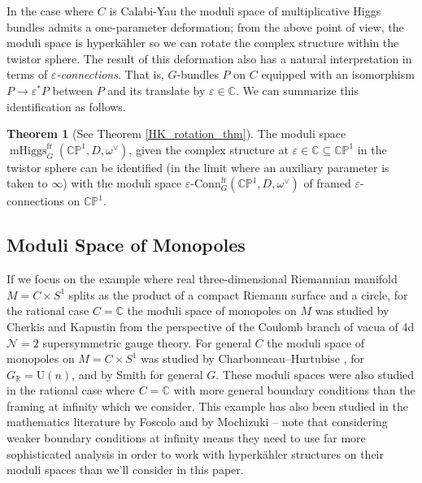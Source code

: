 \documentclass[11pt, oneside, reqno]{amsart}
\theoremstyle{definition} \newtheorem{definition}{Definition}[section]
\newtheorem{theorem}[definition]{Theorem}
\theoremstyle{definition} \newtheorem{remark}[definition]{Remark}
\theoremstyle{definition} \newtheorem{remarks}[definition]{Remarks}
\theoremstyle{definition} \newtheorem{question}[definition]{Question}
\theoremstyle{definition} \newtheorem*{note}{Note}
\theoremstyle{definition} \newtheorem{example}[definition]{Example}
\theoremstyle{definition} \newtheorem{examples}[definition]{Examples}
\renewcommand{\gg}{\mathfrak{g}}
\newcommand{\bb}[1]{\mathbb{#1}}
\newcommand{\mr}[1]{\mathrm{#1}}
\newcommand{\CC}{\mathbb{C}}
\newcommand{\RR}{\mathbb{R}}
\newcommand{\eps}{\varepsilon}
\newcommand{\sub}{\subseteq}
\DeclareMathOperator{\mhiggs}{mHiggs}
\newcommand{\epsconn}{\varepsilon\text{-Conn}}
\renewcommand{\d}{\mathrm{d}}
\begin{document}
 In the case where $C$ is Calabi-Yau the moduli space of multiplicative Higgs bundles admits a one-parameter deformation; from the above point of view, the moduli space is hyperk\"ahler so we can rotate the complex structure within the twistor sphere.  The result of this deformation also has a natural interpretation in terms of \emph{$\eps$-connections}.  That is, $G$-bundles $P$ on $C$ equipped with an isomorphism $P \to \eps^*P$ between $P$ and its translate by $\eps \in \CC$.  We can summarize this identification as follows.
 
 \begin{theorem} [See Theorem \ref{HK_rotation_thm}]
 The moduli space $\mhiggs^{\text{fr}}_G(\bb{CP}^1,D,\omega^\vee)$, given the complex structure at $\eps \in \CC \sub \bb{CP}^1$ in the twistor sphere can be identified (in the limit where an auxiliary parameter is taken to $\infty$) with the moduli space $\epsconn^{\text{fr}}_G(\bb{CP}^1,D,\omega^\vee)$ of framed $\eps$-connections on $\bb{CP}^1$.
 \end{theorem}

\subsection{Moduli Space of Monopoles}

If we focus on the example where real three-dimensional Riemannian
manifold $M = C \times S^1$ splits as the product of a compact Riemann
surface and a circle, for the rational case $C = \CC$ the moduli space
of monopoles on $M$ was studied by Cherkis and Kapustin
\cite{CherkisKapustin1,CherkisKapustin2,CherkisKapustin3} from the
perspective of the Coulomb branch of vacua of 4d $\mathcal{N}=2$
supersymmetric gauge theory. For general $C$ the moduli space of
monopoles on $M = C \times S^{1}$ was studied by
Charbonneau--Hurtubise \cite{CharbonneauHurtubise}, for
$G_\RR = \mr U(n)$, and by Smith \cite{Smith} for general $G$.  These
moduli spaces were also studied in the rational case where $C = \CC$
with more general boundary conditions than the framing at infinity
which we consider.  This example has also been studied in the
mathematics literature by Foscolo \cite{FoscoloDef, FoscoloThesis} and
by Mochizuki \cite{Mochizuki} -- note that considering weaker boundary
conditions at infinity means they need to use far more sophisticated
analysis in order to work with hyperk\"ahler structures on their
moduli spaces than we'll consider in this paper.
\end{document}
